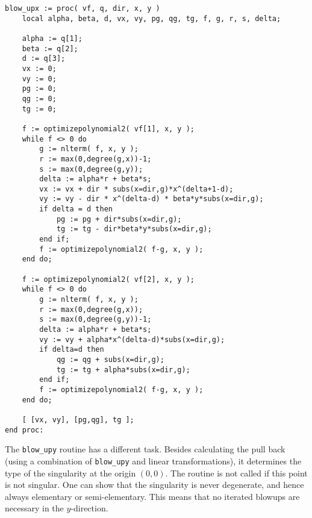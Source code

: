 \documentclass[a4paper,10pt]{article}
\begin{document}
\begin{lstlisting}[name=blowup]
blow_upx := proc( vf, q, dir, x, y )
    local alpha, beta, d, vx, vy, pg, qg, tg, f, g, r, s, delta;

    alpha := q[1];
    beta := q[2];
    d := q[3];
    vx := 0;
    vy := 0;
    pg := 0;
    qg := 0;
    tg := 0;

    f := optimizepolynomial2( vf[1], x, y );
    while f <> 0 do
        g := nlterm( f, x, y );
        r := max(0,degree(g,x))-1;
        s := max(0,degree(g,y));
        delta := alpha*r + beta*s;
        vx := vx + dir * subs(x=dir,g)*x^(delta+1-d);
        vy := vy - dir * x^(delta-d) * beta*y*subs(x=dir,g);
        if delta = d then
            pg := pg + dir*subs(x=dir,g);
            tg := tg - dir*beta*y*subs(x=dir,g);
        end if;
        f := optimizepolynomial2( f-g, x, y );
    end do;

    f := optimizepolynomial2( vf[2], x, y );
    while f <> 0 do
        g := nlterm( f, x, y );
        r := max(0,degree(g,x));
        s := max(0,degree(g,y))-1;
        delta := alpha*r + beta*s;
        vy := vy + alpha*x^(delta-d)*subs(x=dir,g);
        if delta=d then
            qg := qg + subs(x=dir,g);
            tg := tg + alpha*subs(x=dir,g);
        end if;
        f := optimizepolynomial2( f-g, x, y );
    end do;

    [ [vx, vy], [pg,qg], tg ];
end proc:
\end{lstlisting}

The \verb+blow_upy+ routine has a different task.  Besides calculating the pull back (using
a combination of \verb+blow_upy+ and linear transformations), it determines the type of
the singularity at the origin $(0,0)$.  The routine is not called if this point is not singular.
One can show that the singularity is never degenerate, and hence always elementary or semi-elementary.
This means that no iterated blowups are necessary in the $y$-direction.
\end{document}
